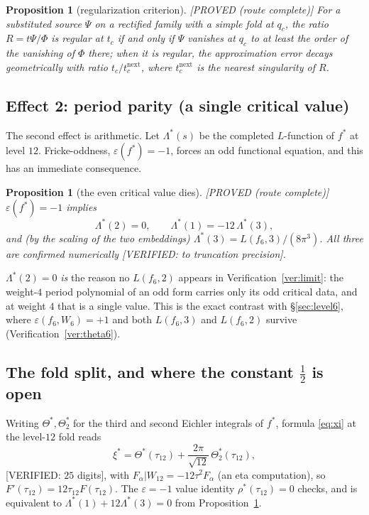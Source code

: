 \documentclass[11pt,reqno]{amsart}
\theoremstyle{plain}
\newtheorem{proposition}[theorem]{Proposition}
\theoremstyle{definition}
\theoremstyle{remark}
\newcommand{\fs}{f^{*}}
\newcommand{\ProvedS}{\textup{\textsf{[PROVED (route complete)]}}}
\newcommand{\VerifiedR}[1]{\textup{\textsf{[VERIFIED: #1]}}}
\begin{document}
\begin{proposition}[regularization criterion]\label{prop:regcrit}
\ProvedS{} For a substituted source $\Psi$ on a rectified family with a
simple fold at $q_c$, the ratio $R=t\Psi/\Phi$ is regular at $t_c$ if and
only if $\Psi$ vanishes at $q_c$ to at least the order of the vanishing of
$\Phi$ there; when it is regular, the approximation error decays
geometrically with ratio $t_c/t_c^{\mathrm{next}}$, where
$t_c^{\mathrm{next}}$ is the nearest singularity of $R$.
\end{proposition}

\subsection{Effect 2: period parity (a single critical value)}
The second effect is arithmetic. Let $\Lambda^*(s)$ be the completed
$L$-function of $\fs$ at level $12$. Fricke-oddness, $\varepsilon(\fs)=-1$,
forces an odd functional equation, and this has an immediate consequence.

\begin{proposition}[the even critical value dies]\label{prop:parity}
\ProvedS{} $\varepsilon(\fs)=-1$ implies
\[
\Lambda^*(2)=0,\qquad \Lambda^*(1)=-12\,\Lambda^*(3),
\]
and (by the scaling of the two embeddings)
$\Lambda^*(3)=L(f_6,3)/(8\pi^3)$. All three are confirmed numerically
\VerifiedR{to truncation precision}.
\end{proposition}

$\Lambda^*(2)=0$ \emph{is} the reason no $L(f_6,2)$ appears in
Verification~\ref{ver:limit}: the weight-$4$ period polynomial of an odd
form carries only its odd critical data, and at weight $4$ that is a single
value. This is the exact contrast with \S\ref{sec:level6}, where
$\varepsilon(f_6,W_6)=+1$ and both $L(f_6,3)$ and $L(f_6,2)$ survive
(Verification~\ref{ver:theta6}).

\subsection{The fold split, and where the constant $\tfrac12$ is open}
Writing $\Theta^*,\Theta^*_2$ for the third and second Eichler integrals of
$\fs$, formula \eqref{eq:xi} at the level-$12$ fold reads
\begin{equation}\label{eq:split12}
\xi^*=\Theta^*(\tau_{12})+\frac{2\pi}{\sqrt{12}}\,\Theta^*_2(\tau_{12}),
\end{equation}
\VerifiedR{$25$ digits}, with $F_\alpha|W_{12}=-12\tau^2F_\alpha$ (an eta
computation), so $F'(\tau_{12})=12\tau_{12}F(\tau_{12})$. The
$\varepsilon=-1$ value identity $\rho^*(\tau_{12})=0$ checks, and is
equivalent to $\Lambda^*(1)+12\Lambda^*(3)=0$ from
Proposition~\ref{prop:parity}.
\end{document}
